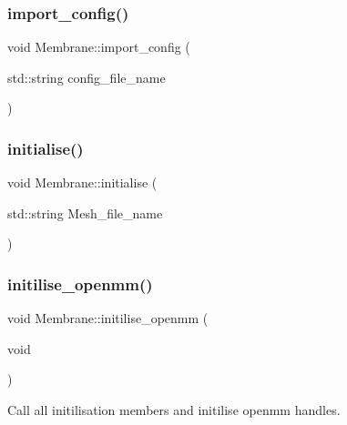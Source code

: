 \mbox{\label{classMembrane_aa332912bee38f3a4a0c45261ffbc497f}} 
\subsubsection{\texorpdfstring{import\_config()}{import\_config()}}
{\footnotesize\ttfamily void Membrane\+::import\+\_\+config (\begin{DoxyParamCaption}\item[{std\+::string}]{config\+\_\+file\+\_\+name }\end{DoxyParamCaption})}

\mbox{\label{classMembrane_ad0a4afaf92d04e327cb74cc5cad2ef7b}} 
\subsubsection{\texorpdfstring{initialise()}{initialise()}}
{\footnotesize\ttfamily void Membrane\+::initialise (\begin{DoxyParamCaption}\item[{std\+::string}]{Mesh\+\_\+file\+\_\+name }\end{DoxyParamCaption})}

\mbox{\label{classMembrane_a8ffb572d8b3b2cf07b2cb5e487fbc3b9}} 
\subsubsection{\texorpdfstring{initilise\_openmm()}{initilise\_openmm()}}
{\footnotesize\ttfamily void Membrane\+::initilise\+\_\+openmm (\begin{DoxyParamCaption}\item[{void}]{ }\end{DoxyParamCaption})}



Call all initilisation members and initilise openmm handles. 

\mbox{\label{classMembrane_a718a254c0f843b06e07d0aad8451b652}} 
